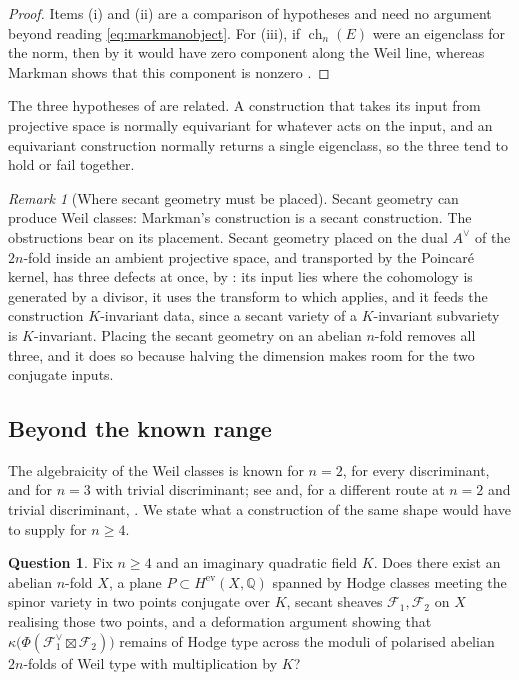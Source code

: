 \documentclass[11pt,reqno]{amsart}
\theoremstyle{plain}
\theoremstyle{definition}
\newtheorem{question}[theorem]{Question}
\theoremstyle{remark}
\newtheorem{remark}[theorem]{Remark}
\newcommand{\QQ}{\mathbb{Q}}
\newcommand{\Av}{A^{\vee}}
\newcommand{\cF}{\mathcal{F}}
\DeclareMathOperator{\ch}{ch}
\begin{document}
\begin{proof}
Items (i) and (ii) are a comparison of hypotheses and need no argument beyond
reading \eqref{eq:markmanobject}. For (iii), if $\ch_{n}(E)$ were an
eigenclass for the norm, then by  it would have zero
component along the Weil line, whereas Markman shows that this component is
nonzero \cite{Mar25b}.
\end{proof}

The three hypotheses of  are related. A construction
that takes its input from projective space is normally equivariant for
whatever acts on the input, and an equivariant construction normally returns
a single eigenclass, so the three tend to hold or fail together.

\begin{remark}[Where secant geometry must be placed]\label{rem:secantlesson}
Secant geometry can produce Weil classes: Markman's construction is a secant
construction. The obstructions bear on its placement. Secant geometry placed
on the dual $\Av$ of the $2n$-fold inside an ambient projective space, and
transported by the Poincar\'e kernel, has three defects at once, by
: its input lies where the cohomology is generated by
a divisor, it uses the transform to which  applies, and it
feeds the construction $K$-invariant data, since a secant variety of a
$K$-invariant subvariety is $K$-invariant. Placing the secant geometry on an
abelian $n$-fold removes all three, and it does so because halving the
dimension makes room for the two conjugate inputs.
\end{remark}

\subsection{Beyond the known range}

The algebraicity of the Weil classes is known for $n=2$, for every
discriminant, and for $n=3$ with trivial discriminant; see \cite{Mar25b} and,
for a different route at $n=2$ and trivial discriminant, \cite{FF26}. We state
what a construction of the same shape would have to supply for $n\ge4$.

\begin{question}\label{q:higher}
Fix $n\ge4$ and an imaginary quadratic field $K$. Does there exist an abelian
$n$-fold $X$, a plane $P\subset H^{\mathrm{ev}}(X,\QQ)$ spanned by Hodge
classes meeting the spinor variety in two points conjugate over $K$, secant
sheaves $\cF_{1},\cF_{2}$ on $X$ realising those two points, and a deformation
argument showing that $\kappa\bigl(\Phi(\cF_{1}^{\vee}\boxtimes\cF_{2})\bigr)$
remains of Hodge type across the moduli of polarised abelian $2n$-folds of
Weil type with multiplication by $K$?
\end{question}
\end{document}
